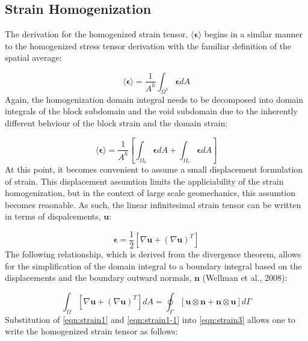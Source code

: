 \subsection{Strain Homogenization}

The derivation for the homogenized strain tensor, $\langle\boldsymbol{\epsilon}\rangle$
begins in a similar manner to the homogenized stress tensor derivation
with the familiar definition of the spatial average:

\begin{equation}
\langle\boldsymbol{\epsilon}\rangle=\frac{1}{A^{h}}\int_{\Omega^{h}}\boldsymbol{\epsilon}dA\label{eqn:strain2}
\end{equation}
Again, the homogenization domain integral needs to be decomposed into
domain integrals of the block subdomain and the void subdomain due
to the inherently different behviour of the block strain and the domain
strain:

\begin{equation}
\langle\boldsymbol{\epsilon}\rangle=\frac{1}{A^{h}}\left[\int_{\Omega_{b}}\boldsymbol{\epsilon}dA+\int_{\Omega_{v}}\boldsymbol{\epsilon}dA\right]\label{eqn:strain3}
\end{equation}
At this point, it becomes convenient to assume a small displacement
formulation of strain. This displacement assumtion limits the appliciability
of the strain homogenization, but in the context of large scale geomechanics,
this assumtion becomes reaonable. As such, the linear infinitesimal
strain tensor can be written in terms of dispalcements, $\mathbf{u}$:

\begin{equation}
\boldsymbol{\epsilon}=\frac{1}{2}\left[\nabla\mathbf{u}+\left(\nabla\mathbf{u}\right)^{T}\right]\label{eqn:strain1}
\end{equation}
The following relationship, which is derived from the divergence theorem,
allows for the simplification of the domain integral to a boundary
integral based on the displacements and the boundary outward normals,
$\mathbf{n}$ (Wellman et al., 2008):

\begin{equation}
\int_{\Omega}\left[\nabla\mathbf{u}+\left(\nabla\mathbf{u}\right)^{T}\right]dA=\oint_{\Gamma}\left[\mathbf{u}\otimes\mathbf{n}+\mathbf{n}\otimes\mathbf{u}\right]d\Gamma\label{eqn:strain1-1}
\end{equation}
Substitution of \ref{eqn:strain1} and \ref{eqn:strain1-1} into \ref{eqn:strain3}
allows one to write the homogenized strain tensor as follows:

